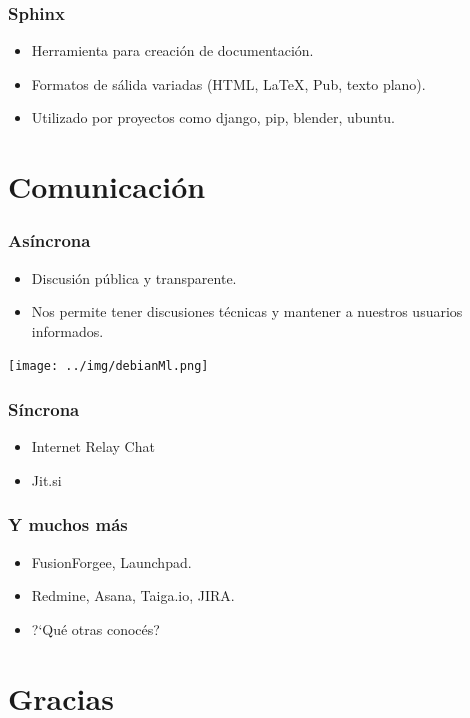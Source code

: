 \documentclass{beamer}
\begin{document}
\begin{frame}
\frametitle{Sphinx}    
		\begin{itemize}
			\pause \item Herramienta para creaci\'on de documentaci\'on.
			\pause \item Formatos de s\'alida variadas (HTML, LaTeX, Pub, texto plano). 
			\pause \item Utilizado por proyectos como django, pip, blender, ubuntu.
 		\end{itemize}

\end{frame}


\section{Comunicaci\'on}
\begin{frame}
	\frametitle{As\'incrona}
		\begin{itemize}
			\pause \item Discusi\'on p\'ublica y transparente.
			\pause \item Nos permite tener discusiones t\'ecnicas y mantener a nuestros usuarios informados.
		\end{itemize}
       \begin{center}
                 \texttt{[image: ../img/debianMl.png]}
        \end{center}
\end{frame}

\begin{frame}
\frametitle{S\'incrona}
	\begin{itemize}
		\pause \item \alert{I}nternet \alert{R}elay \alert{C}hat
		\pause \item Jit.si
	\end{itemize}
\end{frame}
	

\begin{frame}
	\frametitle{Y muchos más}    
	\begin{itemize}
	\pause \item FusionForgee, Launchpad.
	\pause \item Redmine, Asana, Taiga.io, JIRA.
	\pause \item ?`Qu\'e otras conoc\'es?
	\end{itemize}
\end{frame}

\section{Gracias}
\end{document}
